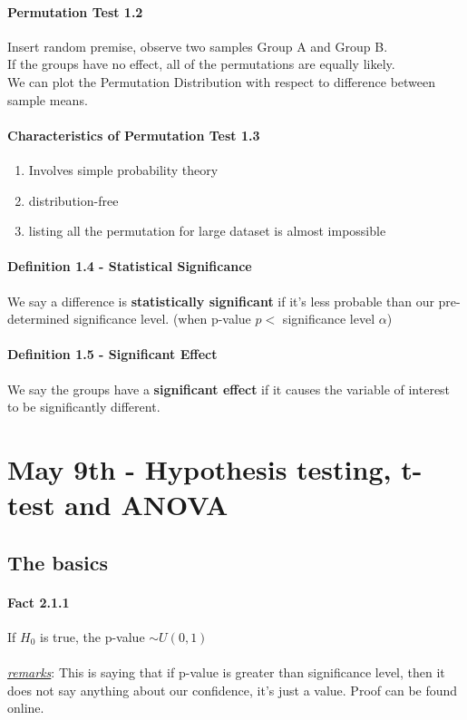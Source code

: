 \documentclass[11pt]{article}
\newcommand{\ti}[1]{\textit{#1}}
\newcommand{\under}[1]{\underline{#1}}
\begin{document}
\paragraph{Permutation Test 1.2}
Insert random premise, observe two samples Group A and Group B. \\
If the groups have no effect, all of the permutations are equally likely. \\
We can plot the Permutation Distribution with respect to difference between sample means.
\paragraph{Characteristics of Permutation Test 1.3}
\begin{enumerate}
	\item Involves simple probability theory
	\item distribution-free
	\item listing all the permutation for large dataset is almost impossible
\end{enumerate}

\paragraph{Definition 1.4 - Statistical Significance}
We say a difference is \textbf{statistically significant} if it's less probable than our pre-determined significance level. (when p-value $p <$  significance level $\alpha$)
\paragraph{Definition 1.5 - Significant Effect} We say the groups have a \textbf{significant effect} if it causes the variable of interest to be significantly different.

\section{May 9th - Hypothesis testing, t-test and ANOVA}
\subsection{The basics}
\paragraph{Fact 2.1.1} If $H_0$ is true, the p-value $\sim U(0,1)$ \\\\
\under{\ti{remarks}}: This is saying that if p-value is greater than significance level, then it does not say anything about our confidence, it's just a value. Proof can be found online.
\end{document}
